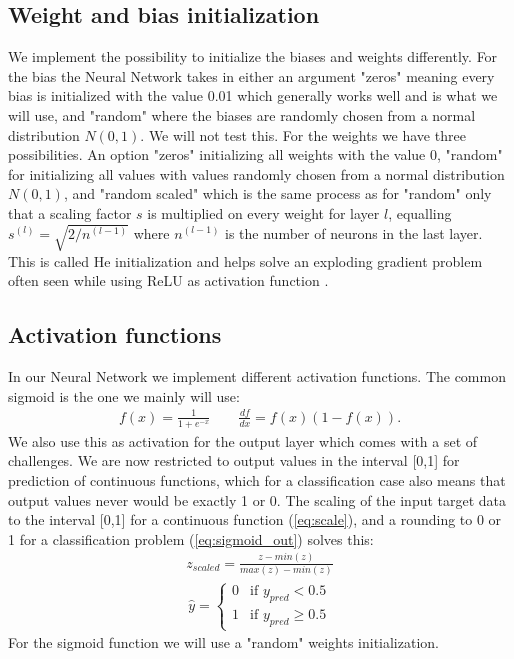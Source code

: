 \documentclass[11pt]{article}
\begin{document}
\subsection{Weight and bias initialization}
We implement the possibility to initialize the biases and weights differently. For the bias the Neural Network takes in either an argument "zeros" meaning every bias is initialized with the value 0.01 which generally works well  \cite{bias} and is what we will use, and "random" where the biases are randomly chosen from a normal distribution $N(0,1)$. We will not test this. For the weights we have three possibilities. An option "zeros" initializing all weights with the value 0, "random" for initializing all values with values randomly chosen from a normal distribution $N(0,1)$, and "random scaled" which is the same process as for "random" only that a scaling factor $s$ is multiplied on every weight for layer $l$, equalling $s^{(l)}=\sqrt{2/n^{(l-1)}}$ where $n^{(l-1)}$ is the number of neurons in the last layer. This is called He initialization and helps solve an exploding gradient problem often seen while using ReLU as activation function \cite{he}\cite{he_2}.

\subsection{Activation functions}
In our Neural Network we implement different activation functions. The common sigmoid is the one we mainly will use:
\begin{align*}
    f(x) = \frac{1 }{1 + e^{-x}} \quad\quad \frac{d f }{dx} = f(x) (1 - f(x)).
\end{align*}
We also use this as activation for the output layer which comes with a set of challenges. We are now restricted to output values in the interval [0,1] for prediction of continuous functions, which for a classification case also means that output values never would be exactly 1 or 0. The scaling of the input target data to the interval [0,1] for a continuous function (\ref{eq:scale}), and a rounding to 0 or 1 for a classification problem (\ref{eq:sigmoid_out}) solves this:
\begin{align}
    \label{eq:scale}
    z_{scaled} = \frac{z- min(z)}{max(z)- min(z)}
\end{align}
\begin{align}
    \label{eq:sigmoid_out}
    \hat{y} =
    \begin{cases}
        0 & \text{if } y_{pred} < 0.5    \\
        1 & \text{if } y_{pred} \geq 0.5
    \end{cases}
\end{align}
For the sigmoid function we will use a "random" weights initialization.
\end{document}
